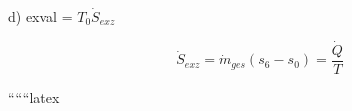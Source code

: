 d) exval = $T_0 \dot{S}_{exz}$

\[
\dot{S}_{exz} = \dot{m}_{ges} \left( s_6 - s_0 \right) = \frac{\dot{Q}}{T}
\]

``````latex